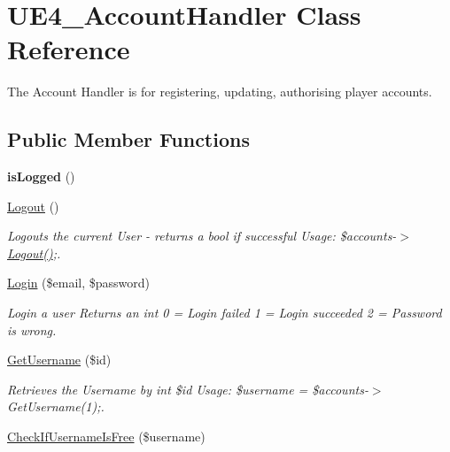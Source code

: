 \hypertarget{class_u_e4___account_handler}{\section{U\-E4\-\_\-\-Account\-Handler Class Reference}
\label{class_u_e4___account_handler}
}


The Account Handler is for registering, updating, authorising player accounts.  


\subsection*{Public Member Functions}
\begin{DoxyCompactItemize}
\item 
\hypertarget{class_u_e4___account_handler_a2e5051c30251e26c6da72ea9cfbe864f}{{\bfseries is\-Logged} ()}\label{class_u_e4___account_handler_a2e5051c30251e26c6da72ea9cfbe864f}

\item 
\hypertarget{class_u_e4___account_handler_aa14f760d541a59acb41ac8eefddafb9b}{\hyperlink{class_u_e4___account_handler_aa14f760d541a59acb41ac8eefddafb9b}{Logout} ()}\label{class_u_e4___account_handler_aa14f760d541a59acb41ac8eefddafb9b}

\begin{DoxyCompactList}\small\item\em Logouts the current User -\/ returns a bool if successful Usage\-: \$accounts-\/$>$\hyperlink{class_u_e4___account_handler_aa14f760d541a59acb41ac8eefddafb9b}{Logout()};. \end{DoxyCompactList}\item 
\hyperlink{class_u_e4___account_handler_aaab81379e488af03ea2a45a8b3a869a4}{Login} (\$email, \$password)
\begin{DoxyCompactList}\small\item\em Login a user Returns an int 0 = Login failed 1 = Login succeeded 2 = Password is wrong. \end{DoxyCompactList}\item 
\hypertarget{class_u_e4___account_handler_a07f33f08153c4014c9e51225db2943c4}{\hyperlink{class_u_e4___account_handler_a07f33f08153c4014c9e51225db2943c4}{Get\-Username} (\$id)}\label{class_u_e4___account_handler_a07f33f08153c4014c9e51225db2943c4}

\begin{DoxyCompactList}\small\item\em Retrieves the Username by int \$id Usage\-: \$username = \$accounts-\/$>$Get\-Username(1);. \end{DoxyCompactList}\item 
\hypertarget{class_u_e4___account_handler_a7f82701030149995176babfd2741d724}{\hyperlink{class_u_e4___account_handler_a7f82701030149995176babfd2741d724}{Check\-If\-Username\-Is\-Free} (\$username)}\label{class_u_e4___account_handler_a7f82701030149995176babfd2741d724}


\end{DoxyCompactItemize}
